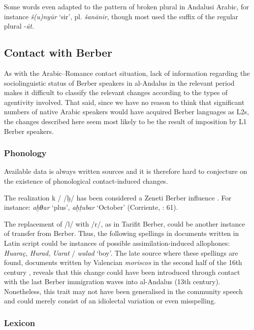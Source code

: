 \documentclass[output=paper,modfonts,nonflat]{langsci/langscibook}
\begin{document}
Some words even adapted to the pattern of broken plural in Andalusi Arabic, for instance \textit{š(u)nyūr} ‘sir’, pl. \textit{šanānīr}, though most used the suffix of the regular plural -\textit{āt.}

\subsection{Contact with Berber}

As with the Arabic–Romance contact situation, lack of information regarding the sociolinguistic status of Berber speakers in al-Andalus in the relevant period makes it difficult to classify the relevant changes according to the types of agentivity involved. That said, since we have no reason to think that significant numbers of native Arabic speakers would have acquired Berber languages as L2s, the changes described here seem most likely to be the result of imposition by L1 Berber speakers.

\subsubsection{Phonology}

Available data is always written sources and it is therefore hard to conjecture on the existence of phonological contact-induced changes. 

The realization k / /ḫ/ has been considered a Zeneti Berber influence \citep[7]{Corriente1981}. For instance: \textit{aḫθar} ‘plus’, \textit{aḫṭubar} ‘October’ (Corriente, \citealt{PereiraVicente2015}: 61).  

The replacement of /l/ with /r/, as in Tarifit Berber, could be another instance of transfer from Berber. Thus, the following spellings in documents written in Latin script could be instances of possible assimilation-induced allophones: \textit{Huaraç,} \textit{Hurad,} \textit{Uarat} / \textit{walad} ‘boy’. The late source where these spellings are found, documents written by Valencian \textit{moriscos} in the second half of the 16th century \citep{Labarta1987}, reveals that this change could have been introduced through contact with the last Berber immigration waves into al-Andalus (13th century). Nonetheless, this trait may not have been generalised in the community speech and could merely consist of an idiolectal variation or even misspelling. 

\subsubsection{Lexicon}
\end{document}
